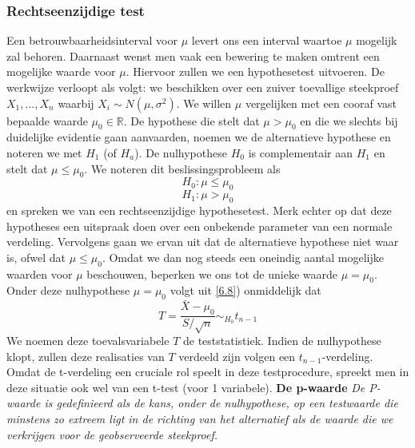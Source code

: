 \documentclass[titlepage]{article}
\numberwithin{equation}{section}
\begin{document}
\subsubsection{Rechtseenzijdige test}
Een betrouwbaarheidsinterval voor $\mu$ levert ons een interval waartoe $\mu$ mogelijk zal behoren. Daarnaast wenst men vaak een bewering te maken omtrent een mogelijke waarde voor $\mu$. Hiervoor zullen we een hypothesetest uitvoeren.\newline\newline
De werkwijze verloopt als volgt: we beschikken over een zuiver toevallige steekproef $X_1, ... , X_n$ waarbij $X_i \sim N(\mu,\sigma^2)$. We willen $\mu$ vergelijken met een cooraf vast bepaalde waarde $\mu_0 \in \mathbb{R}$. De hypothese die stelt dat $\mu> \mu_0$ en die we slechts bij duidelijke evidentie gaan aanvaarden, noemen we de alternatieve hypothese en noteren we met $H_1$ (of  $H_a$). De nulhypothese $H_0$ is complementair aan $H_1$ en stelt dat $\mu\leq\mu_0$. We noteren dit beslissingsprobleem als
\begin{equation}
	H_0: \mu\leq\mu_0
	\label{6.10}
\end{equation}
\begin{equation*}
	H_1: \mu>\mu_0
\end{equation*}
en spreken we van een rechtseenzijdige hypothesetest. Merk echter op dat deze hypotheses een uitspraak doen over een onbekende parameter van een normale verdeling. Vervolgens gaan we ervan uit dat de alternatieve hypothese niet waar is, ofwel dat $\mu \leq \mu_0$. Omdat we dan nog steeds een oneindig aantal mogelijke waarden voor $\mu$ beschouwen, beperken we ons tot de unieke waarde $\mu = \mu_0$. Onder deze nulhypothese $\mu = \mu_0$ volgt uit \ref{6.8}) onmiddelijk dat
\begin{equation}
	T = \frac{\bar{X} - \mu_0}{S/ \sqrt{n}} \sim_{H_0} t_{n-1}
	\label{6.11}
\end{equation}
We noemen deze toevalsvariabele $T$ de teststatistiek. Indien de nulhypothese klopt, zullen deze realisaties van $T$ verdeeld zijn volgen een $t_{n-1}$-verdeling. Omdat de t-verdeling een cruciale rol speelt in deze testprocedure, spreekt men in deze situatie ook wel van een t-test (voor 1 variabele).\newline\newline
\textbf{De p-waarde}\newline\newline
\emph{De P-waarde is gedefinieerd als de kans, onder de nulhypothese, op een testwaarde die minstens zo extreem ligt in de richting van het alternatief als de waarde die we verkrijgen voor de geobserveerde steekproef.}\newline\newline
\end{document}
